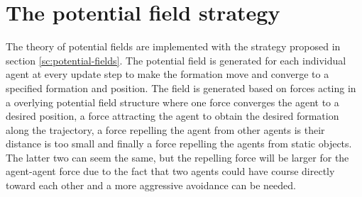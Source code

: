 \section{The potential field strategy}
The theory of potential fields are implemented with the strategy proposed in section \ref{sc:potential-fields}. The potential field is generated for each individual agent at every update step to make the formation move and converge to a specified formation and position. The field is generated based on forces acting in a overlying potential field structure where one force converges the agent to a desired position, a force attracting the agent to obtain the desired formation along the trajectory, a force repelling the agent from other agents is their distance is too small and finally a force repelling the agents from static objects. The latter two can seem the same, but the repelling force will be larger for the agent-agent force due to the fact that two agents could have course directly toward each other and a more aggressive avoidance can be needed.


